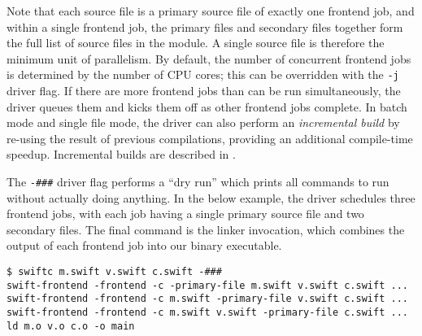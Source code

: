 \documentclass[../generics]{subfiles}
\begin{document}
Note that each source file is a primary source file of exactly one frontend job, and within a single frontend job, the primary files and secondary files together form the full list of source files in the module. A single source file is therefore the minimum unit of parallelism. By default, the number of concurrent frontend jobs is determined by the number of CPU cores; this can be overridden with the \texttt{-j} driver flag. If there are more frontend jobs than can be run simultaneously, the driver queues them and kicks them off as other frontend jobs complete. In batch mode and single file mode, the driver can also perform an \emph{incremental build} by re-using the result of previous compilations, providing an additional compile-time speedup. Incremental builds are described in .

The \verb|-###| driver flag performs a ``dry run'' which prints all commands to run without actually doing anything. In the below example, the driver schedules three frontend jobs, with each job having a single primary source file and two secondary files. The final command is the linker invocation, which combines the output of each frontend job into our binary executable.
\begin{Verbatim}
$ swiftc m.swift v.swift c.swift -###
swift-frontend -frontend -c -primary-file m.swift v.swift c.swift ...
swift-frontend -frontend -c m.swift -primary-file v.swift c.swift ...
swift-frontend -frontend -c m.swift v.swift -primary-file c.swift ...
ld m.o v.o c.o -o main
\end{Verbatim}
\end{document}
